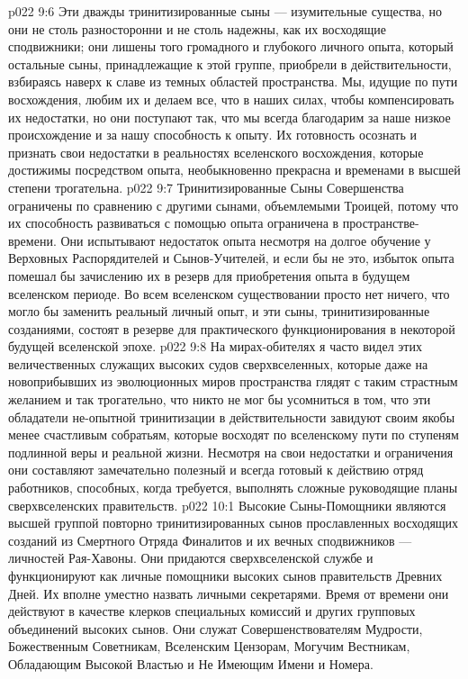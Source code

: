 \vs p022 9:6 Эти дважды тринитизированные сыны --- изумительные существа, но они не столь разносторонни и не столь надежны, как их восходящие сподвижники; они лишены того громадного и глубокого личного опыта, который остальные сыны, принадлежащие к этой группе, приобрели в действительности, взбираясь наверх к славе из темных областей пространства. Мы, идущие по пути восхождения, любим их и делаем все, что в наших силах, чтобы компенсировать их недостатки, но они поступают так, что мы всегда благодарим за наше низкое происхождение и за нашу способность к опыту. Их готовность осознать и признать свои недостатки в реальностях вселенского восхождения, которые достижимы посредством опыта, необыкновенно прекрасна и временами в высшей степени трогательна.
\vs p022 9:7 Тринитизированные Сыны Совершенства ограничены по сравнению с другими сынами, объемлемыми Троицей, потому что их способность развиваться с помощью опыта ограничена в пространстве\hyp{}времени. Они испытывают недостаток опыта несмотря на долгое обучение у Верховных Распорядителей и Сынов\hyp{}Учителей, и если бы не это, избыток опыта помешал бы зачислению их в резерв для приобретения опыта в будущем вселенском периоде. Во всем вселенском существовании просто нет ничего, что могло бы заменить реальный личный опыт, и эти сыны, тринитизированные созданиями, состоят в резерве для практического функционирования в некоторой будущей вселенской эпохе.
\vs p022 9:8 На мирах\hyp{}обителях я часто видел этих величественных служащих высоких судов сверхвселенных, которые даже на новоприбывших из эволюционных миров пространства глядят с таким страстным желанием и так трогательно, что никто не мог бы усомниться в том, что эти обладатели не\hyp{}опытной тринитизации в действительности завидуют своим якобы менее счастливым собратьям, которые восходят по вселенскому пути по ступеням подлинной веры и реальной жизни. Несмотря на свои недостатки и ограничения они составляют замечательно полезный и всегда готовый к действию отряд работников, способных, когда требуется, выполнять сложные руководящие планы сверхвселенских правительств.
\vs p022 10:1 Высокие Сыны\hyp{}Помощники являются высшей группой повторно тринитизированных сынов прославленных восходящих созданий из Смертного Отряда Финалитов и их вечных сподвижников --- личностей Рая\hyp{}Хавоны. Они придаются сверхвселенской службе и функционируют как личные помощники высоких сынов правительств Древних Дней. Их вполне уместно назвать личными секретарями. Время от времени они действуют в качестве клерков специальных комиссий и других групповых объединений высоких сынов. Они служат Совершенствователям Мудрости, Божественным Советникам, Вселенским Цензорам, Могучим Вестникам, Обладающим Высокой Властью и Не Имеющим Имени и Номера.
